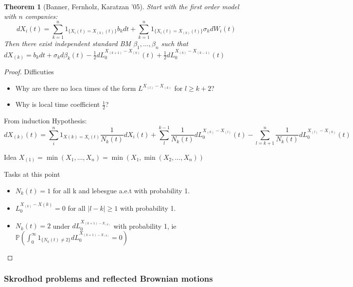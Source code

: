 \documentclass{article} \usepackage[utf8]{inputenc}
\newtheorem{theorem}{Theorem}
\begin{document}
  \begin{theorem}[Banner, Fernholz, Karatzan '05]
    Start with the first order model with $n$ companies:
    $$dX_i(t) = \sum_{k = 1}^n 1_{\{X_i(t) = X_{(k)}(t)\}} b_k dt + \sum_{k = 1}^n 1_{\{X_i(t) = X_{(k)}(t)\}} \sigma_k dW_i(t)$$
    Then there exist independent standard BM $\beta_1, \ldots, \beta_n$ such that
    $dX_{(k)} = b_k dt + \sigma_k d\beta_k(t) - \frac12 dL_0^{X_{(k+1)} - X_{(k)}}(t) + \frac12 dL_0^{X_{(k)} - X_{(k-1)}}(t)$
  \end{theorem}
  \begin{proof}
    Difficuties
    \begin{itemize}
    \item Why are there no loca times of the form $L^{X_{(l)} - X_{(k)}}$ for $l \ge k+2$?
    \item Why is local time coefficient $\frac12$?
    \end{itemize}

    From induction Hypothesis:
    $$dX_{(k)}(t) = \sum_i^n 1_{X(k) = X_i(t)} \frac{1}{N_k(t)} dX_i(t) + \sum_l^{k-1}\frac{1}{N_k(t)} dL_0^{X_{(k)} - X_{(l)}}(t)
    - \sum_{l=k+1}^n \frac{1}{N_k(t)} dL_0^{X_{(l)} - X_{(k)}}(t)
    $$

    Idea $X_{(1)} = \min(X_1, \ldots, X_n) = \min(X_1, \min(X_2, \ldots, X_n))$

    Tasks at this point
    \begin{itemize}
    \item $N_k(t) =1$ for all k and lebesgue a.e.t with probability 1.
    \item $L_0^{X_{(k)} - X{(k)}} = 0$ for all $|l - k| \ge 1$ with probability 1.
    \item $N_k(t) = 2$ under $dL_0^{X_{(k+1) - X_{(k)}}}$ with probability 1, ie
      $\mathbb P(\int_0^\infty 1_{\{N_k(t) \ne 2 \}} dL_0^{X_{(k+1) - X_{(k)}}} = 0)$
    \end{itemize}
  \end{proof}

  \subsubsection{Skrodhod problems and reflected Brownian motions}
\end{document}
